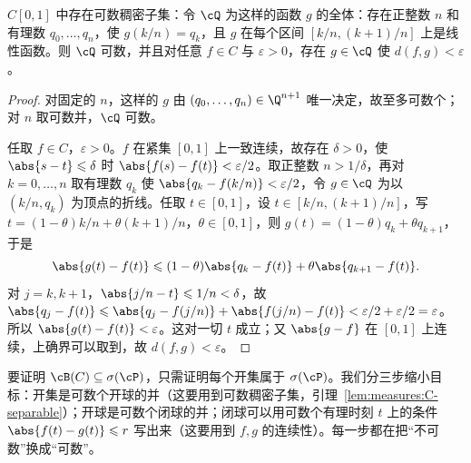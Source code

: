 \begin{lemma}\label{lem:measures:C-separable}
$C[0,1]$ 中存在可数稠密子集：令 $\cQ$ 为这样的函数 $g$ 的全体：存在正整数 $n$ 和有理数 $q_0,\dots,q_n$，使 $g(k/n)=q_k$，且 $g$ 在每个区间 $[k/n,(k+1)/n]$ 上是线性函数。则 $\cQ$ 可数，并且对任意 $f\in C$ 与 $\varepsilon>0$，存在 $g\in\cQ$ 使 $d(f,g)<\varepsilon$。
\end{lemma}
\begin{proof}
对固定的 $n$，这样的 $g$ 由 $(q_0,\dots,q_n)\in\Q^{n+1}$ 唯一决定，故至多可数个；对 $n$ 取可数并，$\cQ$ 可数。

任取 $f\in C$，$\varepsilon>0$。$f$ 在紧集 $[0,1]$ 上一致连续，故存在 $\delta>0$，使 $\abs{s-t}\leqslant\delta$ 时 $\abs{f(s)-f(t)}<\varepsilon/2$。取正整数 $n>1/\delta$，再对 $k=0,\dots,n$ 取有理数 $q_k$ 使 $\abs{q_k-f(k/n)}<\varepsilon/2$，令 $g\in\cQ$ 为以 $(k/n,q_k)$ 为顶点的折线。任取 $t\in[0,1]$，设 $t\in[k/n,(k+1)/n]$，写 $t=(1-\theta)k/n+\theta(k+1)/n$，$\theta\in[0,1]$，则 $g(t)=(1-\theta)q_k+\theta q_{k+1}$，于是
\[
\abs{g(t)-f(t)}\leqslant(1-\theta)\abs{q_k-f(t)}+\theta\abs{q_{k+1}-f(t)}.
\]
对 $j=k,k+1$，$\abs{j/n-t}\leqslant1/n<\delta$，故 $\abs{q_j-f(t)}\leqslant\abs{q_j-f(j/n)}+\abs{f(j/n)-f(t)}<\varepsilon/2+\varepsilon/2=\varepsilon$。所以 $\abs{g(t)-f(t)}<\varepsilon$。这对一切 $t$ 成立；又 $\abs{g-f}$ 在 $[0,1]$ 上连续，上确界可以取到，故 $d(f,g)<\varepsilon$。
\end{proof}

\begin{remark}[证明思路]
要证明 $\cB(C)\subseteq\sigma(\cP)$，只需证明每个开集属于 $\sigma(\cP)$。我们分三步缩小目标：开集是可数个开球的并（这要用到可数稠密子集，引理~\ref{lem:measures:C-separable}）；开球是可数个闭球的并；闭球可以用可数个有理时刻 $t$ 上的条件 $\abs{f(t)-g(t)}\leqslant r$ 写出来（这要用到 $f,g$ 的连续性）。每一步都在把“不可数”换成“可数”。
\end{remark}

